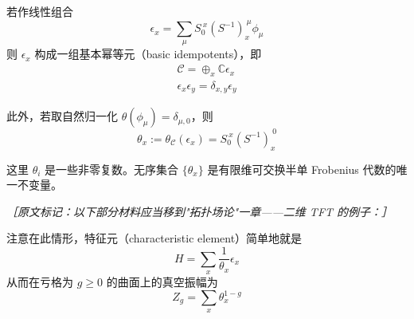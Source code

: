 若作线性组合
\begin{equation}
  \epsilon_x=\sum_\mu S_0^{\ x}(S^{-1})_x^{\ \mu}\phi_\mu
  \tag{4.195}
  \label{eq:4.195}
\end{equation}
则 $\epsilon_x$ 构成一组基本幂等元（basic idempotents），即
\begin{equation}
  \begin{gathered}
    \mathcal{C}=\oplus_x\mathbb{C}\epsilon_x\\
    \epsilon_x\epsilon_y=\delta_{x,y}\epsilon_y
  \end{gathered}
  \tag{4.196}
  \label{eq:4.196}
\end{equation}

此外，若取自然归一化 $\theta(\phi_\mu)=\delta_{\mu,0}$，则
\begin{equation}
  \theta_x:=\theta_{\mathcal{C}}(\epsilon_x)=S_0^{\ x}(S^{-1})_x^{\ 0}
  \tag{4.197}
  \label{eq:4.197}
\end{equation}

这里 $\theta_i$ 是一些非零复数。无序集合 $\{\theta_x\}$ 是有限维可交换半单 Frobenius 代数的唯一不变量。

{\small\itshape ［原文标记：以下部分材料应当移到"拓扑场论"一章——二维 TFT 的例子：］}

注意在此情形，特征元（characteristic element）简单地就是
\begin{equation}
  H=\sum_x\frac{1}{\theta_x}\epsilon_x
  \tag{4.198}
  \label{eq:4.198}
\end{equation}
从而在亏格为 $g\ge0$ 的曲面上的真空振幅为
\begin{equation}
  Z_g=\sum_x\theta_x^{1-g}
  \tag{4.199}
  \label{eq:4.199}
\end{equation}

